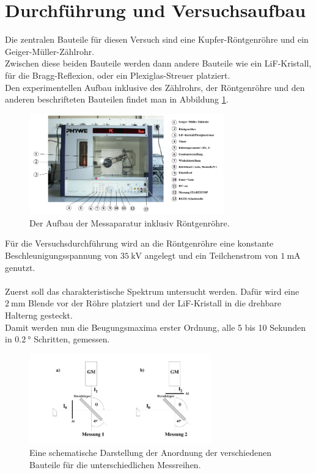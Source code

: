 \section{Durchführung und Versuchsaufbau}


\noindent Die zentralen Bauteile für diesen Versuch sind eine Kupfer-Röntgenröhre und ein Geiger-Müller-Zählrohr.\\
Zwischen diese beiden Bauteile werden dann andere Bauteile wie ein LiF-Kristall, für die Bragg-Reflexion, oder ein Plexiglas-Streuer platziert.\\
Den experimentellen Aufbau inklusive des Zählrohrs, der Röntgenröhre und den anderen beschrifteten Bauteilen findet man in Abbildung \ref{img:aufbau}.



\begin{figure}[h]
    \centering
    \includegraphics[width=0.75\textwidth]{latex/images/roentgenroehre.PNG}
    \caption{Der Aufbau der Messaparatur inklusiv Röntgenröhre\protect \cite{V603}.}
    \label{img:aufbau}
\end{figure}

\noindent
Für die Versuchsdurchführung wird an die Röntgenröhre eine konstante Beschleunigungsspannung von $\SI{35}{\kilo\volt}$ angelegt und ein Teilchenstrom von $\SI{1}{\milli\ampere}$ genutzt.\\\\
Zuerst soll das charakteristische Spektrum untersucht werden. Dafür wird eine $\SI{2}{\milli\metre}$ Blende vor der Röhre platziert und der LiF-Kristall in die drehbare Halterng gesteckt.\\
Damit werden nun die Beugungsmaxima erster Ordnung, alle 5 bis 10 Sekunden in $\SI{0.2}{\degree}$ Schritten, gemessen.\\



\begin{figure}[h]
    \centering
    \includegraphics[width=0.70\textwidth]{latex/images/aufbau.PNG}
    \caption{Eine schematische Darstellung der Anordnung der verschiedenen Bauteile für die unterschiedlichen Messreihen\protect \cite{V603}.}
    \label{img:aufbau2}
\end{figure}

